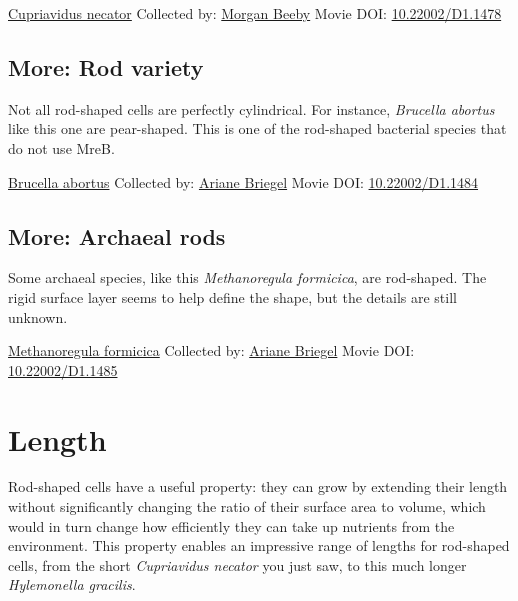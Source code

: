 \documentclass[]{tufte-book}
\begin{document}
\label{fig:3-2}\protect\hyperlink{tree}{Cupriavidus necator} Collected by: \protect\hyperlink{morgan_beeby}{Morgan Beeby} Movie DOI: \href{https://doi.org/10.22002/D1.1478}{10.22002/D1.1478}

\hypertarget{Rod_variety}{%
\subsection*{More: Rod variety}\label{Rod_variety}}

Not all rod-shaped cells are perfectly cylindrical. For instance, \emph{Brucella abortus} like this one are pear-shaped. This is one of the rod-shaped bacterial species that do not use MreB.



\hypertarget{htmlwidget-c43422b1927b8bdb4ac7}{}

\label{fig:3-2a}\protect\hyperlink{tree}{Brucella abortus} Collected by: \protect\hyperlink{ariane_briegel}{Ariane Briegel} Movie DOI: \href{https://doi.org/10.22002/D1.1484}{10.22002/D1.1484}

\hypertarget{Archaeal_rods}{%
\subsection*{More: Archaeal rods}\label{Archaeal_rods}}

Some archaeal species, like this \emph{Methanoregula formicica}, are rod-shaped. The rigid surface layer seems to help define the shape, but the details are still unknown.



\hypertarget{htmlwidget-cd508bf2b6f1a0e24a12}{}

\label{fig:3-2b}\protect\hyperlink{tree}{Methanoregula formicica} Collected by: \protect\hyperlink{ariane_briegel}{Ariane Briegel} Movie DOI: \href{https://doi.org/10.22002/D1.1485}{10.22002/D1.1485}

\hypertarget{length}{%
\section{Length}\label{length}}

Rod-shaped cells have a useful property: they can grow by extending their length without significantly changing the ratio of their surface area to volume, which would in turn change how efficiently they can take up nutrients from the environment. This property enables an impressive range of lengths for rod-shaped cells, from the short \emph{Cupriavidus necator} you just saw, to this much longer \emph{Hylemonella gracilis}.
\end{document}
